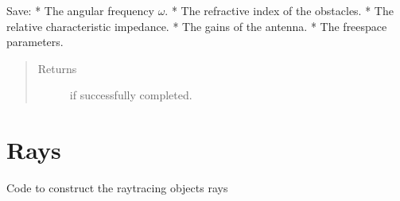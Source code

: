\documentclass[letterpaper,10pt,english]{sphinxmanual}
\begin{document}
\begin{fulllineitems}
Save:
* \sphinxhyphen{} The angular frequency \(\omega\).
*  \sphinxhyphen{} The refractive index of the obstacles.
*   \sphinxhyphen{} The relative characteristic impedance.
*   \sphinxhyphen{} The gains of the antenna.
* \sphinxhyphen{} The freespace parameters.

\begin{sphinxVerbatim}[commandchars=\\\{\}]
\PYG{p}{[}\PYG{p}{]}
\end{sphinxVerbatim}
\begin{quote}\begin{description}
\item[{Returns}]  if successfully completed.

\end{description}\end{quote}

\end{fulllineitems}



\chapter{Rays}
\label{\detokenize{index:module-Rays}}\label{\detokenize{index:rays}}
Code to construct the ray\sphinxhyphen{}tracing objects rays
\end{document}
